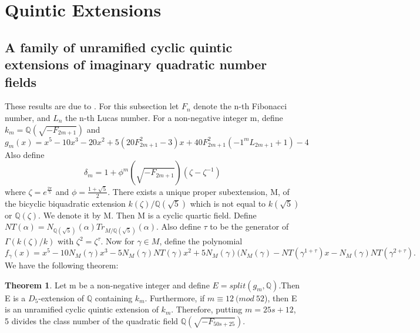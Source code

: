 \documentclass[12pt]{extarticle}
\newcommand{\Q}{\mathbb{Q}}
\newcommand{\<}{\langle}
\renewcommand{\>}{\rangle}
\theoremstyle{definition}
\newtheorem{theorem}{Theorem}
\begin{document}
\section{Quintic Extensions}
\subsection{A family of unramified cyclic quintic extensions of imaginary quadratic number fields}
These results are due to \cite{KISH}. For this subsection let $F_n$ denote the n-th Fibonacci number, and $L_n$ the n-th Lucas number. For a non-negative integer m, define $k_m = \Q(\sqrt{-F_{2m+1}})$ and \begin{equation}
    g_m(x) = x^5 - 10x^3  -20x^2 + 
    5(20F^2_{2m+1} - 3)x
    + 40F^2_{2m+1}(-1^{m}L_{2m+1} + 1)- 4
\end{equation} 
Also define \begin{equation}
    \delta_m = 1+\phi^m(\sqrt{-F_{2m+1}})(\zeta-\zeta^{-1})
\end{equation} where $\zeta = e^{\frac{2\pi}{5}}$ and $\phi = \frac{1+\sqrt{5}}{2}$. There exists a unique proper subextension, M, of the bicyclic biquadratic
extension $k(\zeta)/\Q(\sqrt{5})$ which is not equal to $k(\sqrt{5})$ or $\Q(\zeta)$. We denote it by M. Then M is a cyclic quartic field. Define $NT(\alpha) = N_{\Q(\sqrt{5})}(\alpha)Tr_{M/\Q(\sqrt{5})}(\alpha)$. Also define $\tau$ to be the generator of $\Gamma(k(\zeta)/k)$ with $\zeta^2=\zeta^\tau$.
Now for $\gamma \in M$, define the polynomial \begin{equation}
    f_\gamma(x) = x^5 - 10N_M(\gamma)x^3 - 5N_M(\gamma)NT (\gamma)x^2
+ 5N_M(\gamma)(N_M(\gamma) - NT(\gamma^{1+\tau})x - N_M(\gamma)NT(\gamma^{2+\tau}) 
.
\end{equation}
We have the following theorem: \begin{theorem}
    Let m be a non-negative integer and define $E = split(g_m,\Q)$.Then E is a $D_5$-extension
of $\Q$ containing $k_m$. Furthermore, if $m \equiv 12 \:(mod\:52$), then E is an unramified cyclic quintic extension of $k_m$. Therefore, putting $m = 25s + 12$, 5 divides the class number of the quadratic field $\Q(\sqrt{-F_{50s+25}})$.
\end{theorem}
\end{document}
